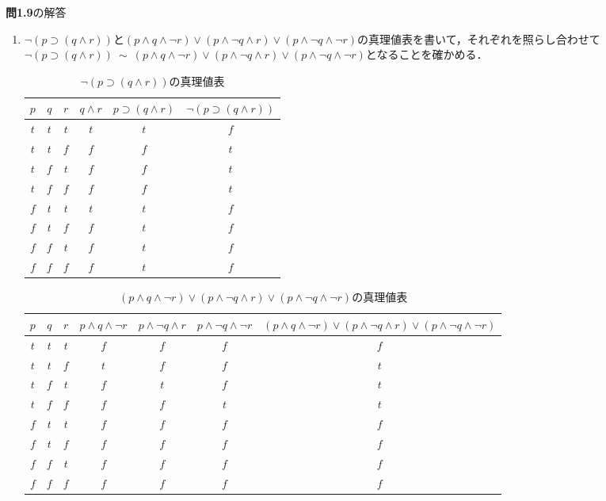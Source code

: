 \documentclass[11pt,dvipdfmx]{jreport}
\begin{document}
\noindent \textbf{問1.9}の解答
\par
\begin{enumerate}
\item
$\lnot(p \supset (q \land r))$と$(p \land q \land \lnot r) \lor (p \land \lnot q \land r) \lor (p \land \lnot q \land \lnot r)$の真理値表を書いて，それぞれを照らし合わせて$\lnot(p \supset (q \land r)) \ \sim \ (p \land q \land \lnot r) \lor (p \land \lnot q \land r) \lor (p \land \lnot q \land \lnot r)$となることを確かめる．
\begin{table}[!htbp]
\centering
\caption{$\lnot(p \supset (q \land r))$の真理値表}
\vspace{3mm}
\begin{tabular}{c|c|c|c|c|c}
  $p$ & $q$ & $r$ & $q \land r$ & $p \supset (q \land r)$ & $\lnot (p \supset (q \land r))$ \\ \hline
  $t$ & $t$ & $t$ & $t$         & $t$                     & $f$ \\ \hline
  $t$ & $t$ & $f$ & $f$         & $f$                     & $t$ \\ \hline
  $t$ & $f$ & $t$ & $f$         & $f$                     & $t$ \\ \hline
  $t$ & $f$ & $f$ & $f$         & $f$                     & $t$ \\ \hline
  $f$ & $t$ & $t$ & $t$         & $t$                     & $f$ \\ \hline
  $f$ & $t$ & $f$ & $f$         & $t$                     & $f$ \\ \hline
  $f$ & $f$ & $t$ & $f$         & $t$                     & $f$ \\ \hline
  $f$ & $f$ & $f$ & $f$         & $t$                     & $f$ 
\end{tabular}
\label{tb:1_9_1}
\end{table}

\begin{table}[!htbp]
\centering
  \caption{$(p \land q \land \lnot r) \lor (p \land \lnot q \land r) \lor (p \land \lnot q \land \lnot r)$の真理値表}
  \vspace{3mm}
  \begin{tabular}{c|c|c|c|c|c|c}
   $p$ & $q$ & $r$ & $p \land q \land \lnot r$ & $p \land \lnot q \land r$ & $p \land \lnot q \land \lnot r$ & $(p \land q \land \lnot r) \lor (p \land \lnot q \land r) \lor (p \land \lnot q \land \lnot r)$ \\ \hline
   $t$ & $t$ & $t$ & $f$ & $f$ & $f$ & $f$ \\ \hline
   $t$ & $t$ & $f$ & $t$ & $f$ & $f$ & $t$ \\ \hline
   $t$ & $f$ & $t$ & $f$ & $t$ & $f$ & $t$ \\ \hline 
   $t$ & $f$ & $f$ & $f$ & $f$ & $t$ & $t$ \\ \hline
   $f$ & $t$ & $t$ & $f$ & $f$ & $f$ & $f$ \\ \hline 
   $f$ & $t$ & $f$ & $f$ & $f$ & $f$ & $f$ \\ \hline
   $f$ & $f$ & $t$ & $f$ & $f$ & $f$ & $f$ \\ \hline
   $f$ & $f$ & $f$ & $f$ & $f$ & $f$ & $f$
  \end{tabular}
  \label{tb:1_9_2}
\end{table}


\end{enumerate}
\end{document}
